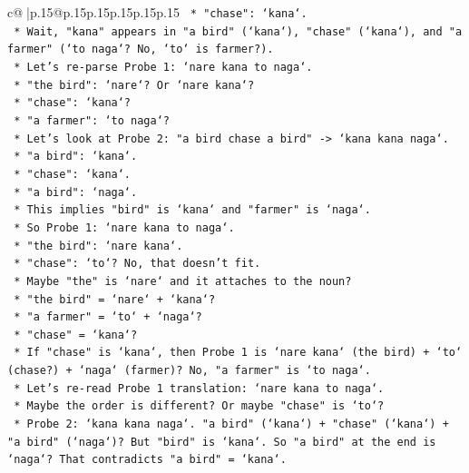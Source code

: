 \documentclass{article}
\begin{document}
{\begin{supertabular}{c@{$\;$}|p{.15\linewidth}@{}p{.15\linewidth}p{.15\linewidth}p{.15\linewidth}p{.15\linewidth}p{.15\linewidth}}
{{{\texttt{            *   "chase": `kana`.} \\
\texttt{            *   Wait, "kana" appears in "a bird" (`kana`), "chase" (`kana`), and "a farmer" (`to naga`? No, `to` is farmer?).} \\
\texttt{            *   Let's re{-}parse Probe 1: `nare kana to naga`.} \\
\texttt{                *   "the bird": `nare`? Or `nare kana`?} \\
\texttt{                *   "chase": `kana`?} \\
\texttt{                *   "a farmer": `to naga`?} \\
\texttt{            *   Let's look at Probe 2: "a bird chase a bird" {-}> `kana kana naga`.} \\
\texttt{                *   "a bird": `kana`.} \\
\texttt{                *   "chase": `kana`.} \\
\texttt{                *   "a bird": `naga`.} \\
\texttt{                *   This implies "bird" is `kana` and "farmer" is `naga`.} \\
\texttt{                *   So Probe 1: `nare kana to naga`.} \\
\texttt{                    *   "the bird": `nare kana`.} \\
\texttt{                    *   "chase": `to`? No, that doesn't fit.} \\
\texttt{                    *   Maybe "the" is `nare` and it attaches to the noun?} \\
\texttt{                    *   "the bird" = `nare` + `kana`?} \\
\texttt{                    *   "a farmer" = `to` + `naga`?} \\
\texttt{                    *   "chase" = `kana`?} \\
\texttt{                    *   If "chase" is `kana`, then Probe 1 is `nare kana` (the bird) + `to` (chase?) + `naga` (farmer)? No, "a farmer" is `to naga`.} \\
\texttt{                    *   Let's re{-}read Probe 1 translation: `nare kana to naga`.} \\
\texttt{                    *   Maybe the order is different? Or maybe "chase" is `to`?} \\
\texttt{                    *   Probe 2: `kana kana naga`. "a bird" (`kana`) + "chase" (`kana`) + "a bird" (`naga`)? But "bird" is `kana`. So "a bird" at the end is `naga`? That contradicts "a bird" = `kana`.} \\
}}}
\end{supertabular}}
\end{document}
